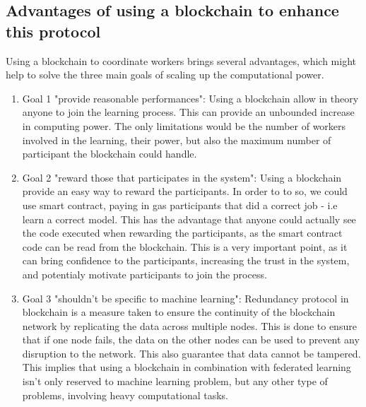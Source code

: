 \documentclass{article}
\begin{document}
\subsection{Advantages of using a blockchain to enhance this protocol}
Using a blockchain to coordinate workers brings several advantages, which might help to solve the three main goals of
scaling up the computational power.
\begin{enumerate}
    \item Goal 1 "provide reasonable performances": Using a blockchain allow in theory anyone to join the learning
process. This can provide an unbounded increase in computing power. The only limitations would be the number of workers
involved in the learning, their power, but also the maximum number of participant the blockchain could handle.
    \item Goal 2 "reward those that participates in the system": Using a blockchain provide an easy way to reward the
participants. In order to to so, we could use smart contract, paying in gas participants that did a correct job - i.e
learn a correct model. This has the advantage that anyone could actually see the code executed when rewarding the
participants, as the smart contract code can be read from the blockchain. This is a very important point,
as it can bring confidence to the participants, increasing the trust in the system, and potentialy motivate participants
to join the process.
    \item Goal 3 "shouldn't be specific to machine learning": Redundancy protocol in blockchain is a measure taken to
ensure the continuity of the blockchain network by replicating the data across multiple nodes. This is done to ensure
that if one node fails, the data on the other nodes can be used to prevent any disruption to the network. This also
guarantee that data cannot be tampered. This implies that using a blockchain in combination with federated learning
isn't only reserved to machine learning problem, but any other type of problems, involving heavy computational tasks.
\end{enumerate}
\end{document}

